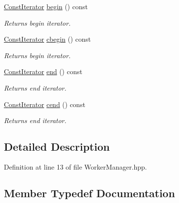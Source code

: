 \begin{DoxyCompactItemize}
\hyperlink{class_crawler_1_1_worker_manager_a5160dd76c74ca0275a642b6d1d6d08bc}{Const\+Iterator} \hyperlink{class_crawler_1_1_worker_manager_a27b89da04231f14c39c77f911373e8b2}{begin} () const 
\begin{DoxyCompactList}\small\item\em Returns begin iterator. \end{DoxyCompactList}\item 
\hyperlink{class_crawler_1_1_worker_manager_a5160dd76c74ca0275a642b6d1d6d08bc}{Const\+Iterator} \hyperlink{class_crawler_1_1_worker_manager_ab37a1b8ce853882d0227f25f7aa11230}{cbegin} () const 
\begin{DoxyCompactList}\small\item\em Returns begin iterator. \end{DoxyCompactList}\item 
\hyperlink{class_crawler_1_1_worker_manager_a5160dd76c74ca0275a642b6d1d6d08bc}{Const\+Iterator} \hyperlink{class_crawler_1_1_worker_manager_a4decbfcf3e4892050cd6691081f2a70f}{end} () const 
\begin{DoxyCompactList}\small\item\em Returns end iterator. \end{DoxyCompactList}\item 
\hyperlink{class_crawler_1_1_worker_manager_a5160dd76c74ca0275a642b6d1d6d08bc}{Const\+Iterator} \hyperlink{class_crawler_1_1_worker_manager_a48b7d5a1ce5359bc59844b1d8699f154}{cend} () const 
\begin{DoxyCompactList}\small\item\em Returns end iterator. \end{DoxyCompactList}\end{DoxyCompactItemize}


\subsection{Detailed Description}


Definition at line 13 of file Worker\+Manager.\+hpp.



\subsection{Member Typedef Documentation}
\hypertarget{class_crawler_1_1_worker_manager_a5160dd76c74ca0275a642b6d1d6d08bc}{}
